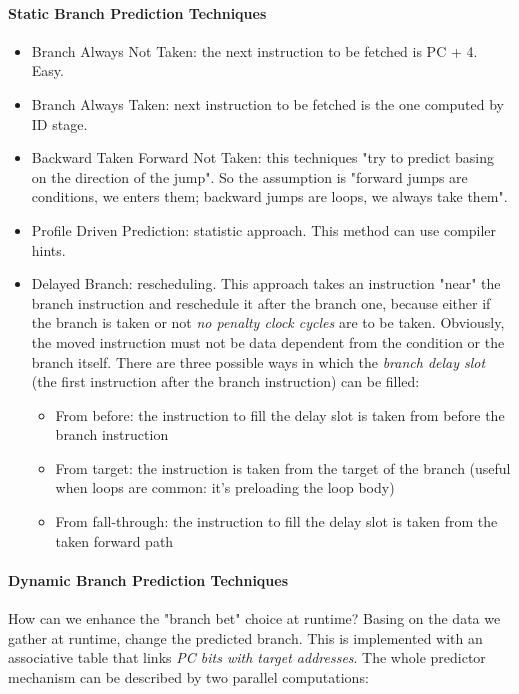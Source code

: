 \documentclass[10pt,a4paper]{article}
\begin{document}
					\paragraph{Static Branch Prediction Techniques} 
						\begin{itemize}
							\item Branch Always Not Taken: the next instruction to be fetched is PC + 4. Easy.
							\item Branch Always Taken: next instruction to be fetched is the one computed by ID stage.
							\item Backward Taken Forward Not Taken: this techniques "try to predict basing on the direction of the jump". So the assumption is "forward jumps are conditions, we enters them; backward jumps are loops, we always take them".
							\item Profile Driven Prediction: statistic approach. This method can use compiler hints.
							\item Delayed Branch: rescheduling. This approach takes an instruction "near" the branch instruction and reschedule it after the branch one, because either if the branch is taken or not \emph{no penalty clock cycles} are to be taken. Obviously, the moved instruction must not be data dependent from the condition or the branch itself. There are three possible ways in which the \emph{branch delay slot} (the first instruction after the branch instruction) can be filled:
								\begin{itemize}
									\item From before: the instruction to fill the delay slot is taken from before the branch instruction
									\item From target: the instruction is taken from the target of the branch (useful when loops are common: it's preloading the loop body)
									\item From fall-through: the instruction to fill the delay slot is taken from the taken forward path
								\end{itemize}
						\end{itemize}
						
					\paragraph{Dynamic Branch Prediction Techniques}
						How can we enhance the "branch bet" choice at runtime? Basing on the data we gather at runtime, change the predicted branch. This is implemented with an associative table that links \emph{PC bits with target addresses}. The whole predictor mechanism can be described by two parallel computations:
						
\end{document}
